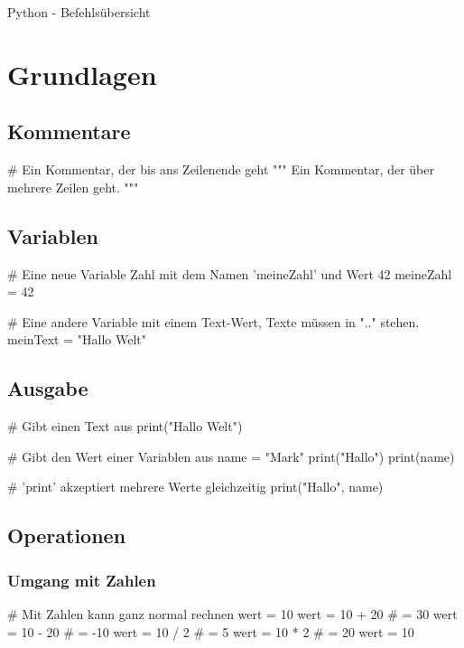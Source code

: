 \documentclass{\VorlagenPfad/coderdojokatext}
\newcommand{\Titel}{Python - Befehlsübersicht}
\begin{document}
\setcounter{chapter}{0}

\begin{center}
	{\huge \Titel}
\end{center}

\chapter{Grundlagen}
\section{Kommentare}
\begin{pythoncode}
# Ein Kommentar, der bis ans Zeilenende geht
"""
Ein Kommentar, der über
mehrere Zeilen geht.
"""
\end{pythoncode}
\section{Variablen}
\begin{pythoncode}
# Eine neue Variable Zahl mit dem Namen 'meineZahl' und Wert 42
meineZahl = 42

# Eine andere Variable mit einem Text-Wert, Texte müssen in ".." stehen.
meinText = "Hallo Welt"
\end{pythoncode}

\section{Ausgabe}

\begin{pythoncode}
# Gibt einen Text aus
print("Hallo Welt")

\end{pythoncode}
\begin{pythoncode}
# Gibt den Wert einer Variablen aus
name = "Mark"
print("Hallo")
print(name)

# 'print' akzeptiert mehrere Werte gleichzeitig
print("Hallo", name)
\end{pythoncode}

\section{Operationen}
\subsection{Umgang mit Zahlen}
\begin{pythoncode}
# Mit Zahlen kann ganz normal rechnen
wert = 10 
wert = 10 + 20	# = 30
wert = 10 - 20	# = -10
wert = 10 / 2	# = 5
wert = 10 * 2	# = 20
wert = 10 %
\end{pythoncode}
\end{document}
